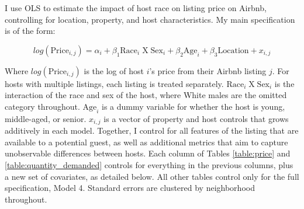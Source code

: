 
I use OLS to estimate the impact of host race on listing price on Airbnb, controlling for location, property, and host characteristics. My main specification is of the form:

\[ log(\text{Price}_{i,j}) = \alpha_i + \beta_1 \text{Race}_{i} \;  \text{X} \; \text{Sex}_i + \beta_2 \text{Age}_i + \beta_3 \text{Location} +  x_{i,j} \]

Where $log(\text{Price}_{i,j})$ is the log of host $i$'s price from their Airbnb listing $j$. For hosts with multiple listings, each listing is treated separately. $\text{Race}_{i} \;  \text{X} \; \text{Sex}_i$ is the interaction of the race and sex of the host, where White males are the omitted category throughout. $\text{Age}_i$ is a dummy variable for whether the host is young, middle-aged, or senior. $x_{i,j}$ is a vector of property and host controls that grows additively in each model. Together, I control for all features of the listing that are available to a potential guest, as well as additional metrics that aim to capture unobservable differences between hosts. Each column of Tables \ref{table:price} and \ref{table:quantity_demanded} controls for everything in the previous columns, plus a new set of covariates, as detailed below. All other tables control only for the full specification, Model 4. Standard errors are clustered by neighborhood throughout.

